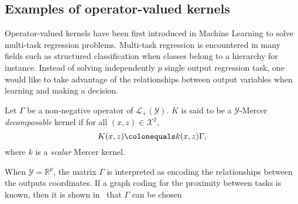 \subsection{Examples of operator-valued kernels}
\label{subsec:ovk-ex}
Operator-valued kernels have been first introduced in Machine Learning to solve
multi-task regression problems. Multi-task regression is encountered in many
fields such as structured classification when classes belong to a hierarchy for
instance. Instead of solving independently $p$ single output regression task,
one would like to take advantage of the relationships between output variables
when learning and making a decision.
\begin{definition}
    \label{dec-kernel}
    Let $\Gamma$ be a non-negative operator of $\mathcal{L}_+(\mathcal{Y})$.
    $K$ is said to be a $\mathcal{Y}$-Mercer \emph{decomposable}
    kernel if for
    all $(x,z) \in \mathcal{X}^2$,
    \begin{dmath*}
        K(x,z) \colonequals k(x,z)\Gamma,
    \end{dmath*}
    where $k$ is a \emph{scalar} Mercer kernel.
\end{definition}
When $\mathcal{Y}=\mathbb{R}^p$, the matrix $\Gamma$ is
interpreted as encoding the relationships between the outputs coordinates.
If a graph coding for the proximity between tasks is known, then it is shown
in~\citet{Evgeniou2005,Baldassare2010,Alvarez2012} that $\Gamma$ can be chosen
